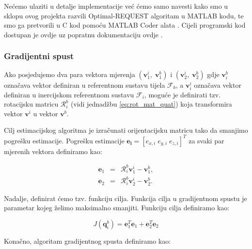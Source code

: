 \documentclass[times, utf8, diplomski, numeric]{templates/template}
\begin{document}
{{{{                Nećemo ulaziti u detalje implementacije već ćemo samo navesti kako smo u sklopu ovog projekta razvili Optimal-REQUEST algoritam u MATLAB kodu, te smo ga pretvorili u C kod pomoću MATLAB Coder alata \cite{matlab_coder}. Cijeli programski kod dostupan je ovdje \cite{opt_req_kod} uz popratnu dokumentaciju ovdje \cite{opt_req_dokumen}. 
            }

            \subsubsection{Gradijentni spust }{
                Ako posjedujemo dva para vektora mjerenja $(\boldsymbol{v}_1^i, \; \boldsymbol{v}_1^b)$ i $(\boldsymbol{v}_2^i, \; \boldsymbol{v}_2^b)$ gdje $\boldsymbol{v}_i^b$ označava vektor definiran u referentnom sustavu tijela $\mathcal{F}_b$, a $\boldsymbol{v}_i^i$ označava vektor definiran u inercijskom referentnom sustavu $\mathcal{F}_i$, moguće je definirati tzv. rotacijsku matricu $\mathcal{R}_i^b$ (vidi jednadžbu \ref{eq:rot_mat_quat}) koja transformira vektor $\boldsymbol{v}^i $ u vektor $\boldsymbol{v}^b$. 

                Cilj estimacijskog algoritma je izračunati orijentacijsku matricu tako da smanjimo pogrešku estimacije. Pogrešku estimacije $\boldsymbol{e_i} = \left[e_{x,i} \; e_{y,i} \; e_{z,i}\right]^T$ za svaki par mjerenih vektora definiramo kao:

                \begin{equation}
                \begin{array}{rcl}
                    \boldsymbol{e}_1 & = & \mathcal{R}_i^b \boldsymbol{v}_1^i - \boldsymbol{v}_1^b, \\
                    \boldsymbol{e}_2 & = & \mathcal{R}_i^b \boldsymbol{v}_2^i - \boldsymbol{v}_2^b. 
                \end{array}
                \end{equation} 

                Nadalje, definirat ćemo tzv. funkciju cilja. Funkcija cilja u gradijentnom spustu je parametar kojeg želimo maksimalno smanjiti. Funkciju cilja definiramo kao:

                \begin{equation}
                    J(\boldsymbol{q}_i^b) = \boldsymbol{e}_1^T \boldsymbol{e}_1 + \boldsymbol{e}_2^T \boldsymbol{e}_2
                \end{equation}

                Konačno, algoritam gradijentnog spusta definiramo kao:

}}}}
\end{document}
